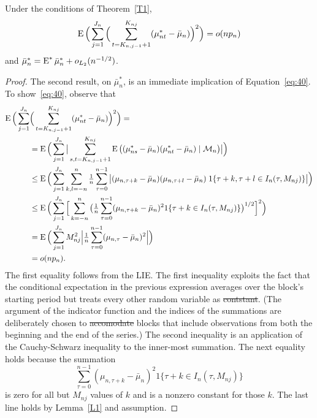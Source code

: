 \documentclass[11pt]{article}
\providecommand{\DIFadd}[1]{{\protect\color{blue}\uwave{#1}}} %
\providecommand{\DIFdel}[1]{{\protect\color{red}\sout{#1}}}                      %
\providecommand{\DIFaddbegin}{} %
\providecommand{\DIFaddend}{} %
\providecommand{\DIFdelbegin}{} %
\providecommand{\DIFdelend}{} %
\begin{document}
\begin{lem}\label{L3}
Under the conditions of Theorem~\ref{T1},
\begin{equation}\label{eq:40}
  \operatorname{E} \Big(\sum_{j=1}^{J_n} \Big( \sum_{t = K_{n,j-1}+1}^{K_{nj}}
  (\mu_{nt}^{*} - \bar \mu_n)\Big)^2\Big) = o(n p_n)
\end{equation}
and $\bar \mu_n^{*} = \operatorname{E}^{*} \bar \mu_n^{*} + o_{L_2}(n^{-1/2})$.
\end{lem}
\begin{proof}
  The second result, on $\bar\mu_n^*$, is an immediate implication of
  Equation~\eqref{eq:40}. To show~\eqref{eq:40}, observe that
  \begin{align*}
    \operatorname{E} \Big(\sum_{j=1}^{J_n} &\Big( \sum_{t= K_{n,j-1} +1}^{K_{nj}}
    (\mu_{nt}^{*} - \bar \mu_n)\Big)^2\Big)= \\
    &= \operatorname{E}\Big(\sum_{j=1}^{J_n} \big\lvert \sum_{s,t = K_{n,j-1}+1}^{K_{nj}}
    \operatorname{E} \big((\mu_{ns}^{*} - \bar{\mu}_n)
    (\mu_{nt}^{*} - \bar{\mu}_n) \mid \mathcal{M}_n \big) \big\rvert \Big)\\
    &\leq \operatorname{E}\Big( \sum_{j=1}^{J_n}
    \sum_{k,l = -n}^{n} \tfrac{1}{n} \sum_{\tau=0}^{n-1} \big\lvert
    (\mu_{n,\tau+k} - \bar{\mu}_n) (\mu_{n,\tau+l} - \bar{\mu}_n) \;
    1\{ \tau + k, \tau + l \in I_n(\tau, M_{nj})\} \big\rvert \Big)\\
    &\leq \operatorname{E}\Big(\sum_{j=1}^{J_n} \Big[
    \sum_{k = -n}^{n} \big(\tfrac{1}{n} \sum_{\tau=0}^{n-1}
    (\mu_{n,\tau+k} - \bar{\mu}_n)^2
    1\{ \tau + k \in I_n(\tau, M_{nj})\}\big)^{1/2}\Big]^{2}\Big)\\
    &= \operatorname{E}\Big(\sum_{j=1}^{J_n}
    M_{nj}^2 \Big\lvert \tfrac{1}{n} \sum_{\tau=0}^{n-1}
    (\mu_{n,\tau} - \bar{\mu}_n)^2 \Big\lvert\Big)\\
    &= o(n p_n).
  \end{align*}
  The first equality follows from the LIE\@. The first inequality
  exploits the fact that the conditional expectation in the previous
  expression averages over the block's starting period but treats
  every other random variable as \DIFdelbegin \DIFdel{contstant}\DIFdelend \DIFaddbegin \DIFadd{constant}\DIFaddend . (The argument of the
  indicator function and the indices of the summations are
  deliberately chosen to \DIFdelbegin \DIFdel{accomodate }\DIFdelend \DIFaddbegin \DIFadd{accommodate }\DIFaddend blocks that include observations
  from both the beginning and the end of the series.) The second
  inequality is an application of the Cauchy-Schwarz inequality to the
  inner-most summation. The next equality holds because the
  summation
  \[
    \sum_{\tau=0}^{n-1} (\mu_{n,\tau+k} - \bar{\mu}_n)^2
    1\{ \tau + k \in I_n(\tau, M_{nj})\}
  \]
  is zero for all but $M_{nj}$ values of $k$ and is a nonzero constant
  for those $k$. The last line holds by Lemma~\ref{L1} and assumption.
\end{proof}
\end{document}
